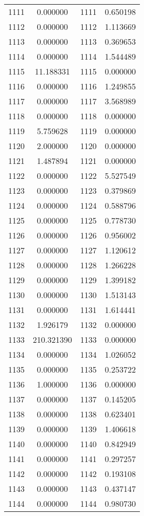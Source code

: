\documentclass[12pt]{article}
\begin{document}
\begin{longtable}{@{}cccc@{}}
1111 & 0.000000 & 1111 & 0.650198 \\
1112 & 0.000000 & 1112 & 1.113669 \\
1113 & 0.000000 & 1113 & 0.369653 \\
1114 & 0.000000 & 1114 & 1.544489 \\
1115 & 11.188331 & 1115 & 0.000000 \\
1116 & 0.000000 & 1116 & 1.249855 \\
1117 & 0.000000 & 1117 & 3.568989 \\
1118 & 0.000000 & 1118 & 0.000000 \\
1119 & 5.759628 & 1119 & 0.000000 \\
1120 & 2.000000 & 1120 & 0.000000 \\
1121 & 1.487894 & 1121 & 0.000000 \\
1122 & 0.000000 & 1122 & 5.527549 \\
1123 & 0.000000 & 1123 & 0.379869 \\
1124 & 0.000000 & 1124 & 0.588796 \\
1125 & 0.000000 & 1125 & 0.778730 \\
1126 & 0.000000 & 1126 & 0.956002 \\
1127 & 0.000000 & 1127 & 1.120612 \\
1128 & 0.000000 & 1128 & 1.266228 \\
1129 & 0.000000 & 1129 & 1.399182 \\
1130 & 0.000000 & 1130 & 1.513143 \\
1131 & 0.000000 & 1131 & 1.614441 \\
1132 & 1.926179 & 1132 & 0.000000 \\
1133 & 210.321390 & 1133 & 0.000000 \\
1134 & 0.000000 & 1134 & 1.026052 \\
1135 & 0.000000 & 1135 & 0.253722 \\
1136 & 1.000000 & 1136 & 0.000000 \\
1137 & 0.000000 & 1137 & 0.145205 \\
1138 & 0.000000 & 1138 & 0.623401 \\
1139 & 0.000000 & 1139 & 1.406618 \\
1140 & 0.000000 & 1140 & 0.842949 \\
1141 & 0.000000 & 1141 & 0.297257 \\
1142 & 0.000000 & 1142 & 0.193108 \\
1143 & 0.000000 & 1143 & 0.437147 \\
1144 & 0.000000 & 1144 & 0.980730 \\

\end{longtable}
\end{document}
